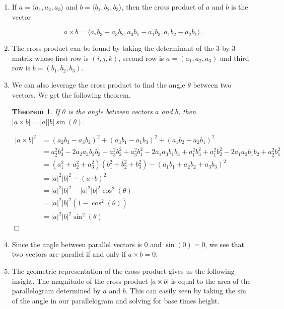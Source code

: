 \documentclass[11pt]{article}
\newtheorem{theorem}{Theorem}
\renewenvironment{proof}{{\noindent \textbf{\textit{Proof.}}}}
{\hfill $\Box$ \vspace*{0.1in}}
\begin{document}
\begin{enumerate}
    \item If $a = \langle a_1,a_2,a_3 \rangle$ and $b = \langle b_1,b_2,b_3 \rangle$, then the cross product of $a$ and $b$ is the vector 

    \begin{equation*}
        a \times b = \langle a_2b_3-a_3b_2, a_3b_1-a_1b_3, a_1b_2 - a_2b_1 \rangle.
    \end{equation*}


    \item The cross product can be found by taking the determinant of the 3 by 3 matrix whose first row is $(i,j,k)$, second row is $a = (a_1,a_2,a_3)$ and third row is $b = (b_1,b_2,b_3)$.

    \item  We can also leverage the cross product to find the angle $\theta$ between two vectors. We get the following theorem.

    \begin{theorem}
        If $\theta$ is the angle between vectors $a$ and $b$, then $|a\times b| = |a||b|\sin(\theta)$.
    \end{theorem}

    \begin{proof}
    \begin{align*}
        |a\times b|^2 &= (a_2b_3-a_3b_2)^2+(a_3b_1-a_1b_3)^2+(a_1b_2-a_2b_1)^2 \\
        &= a_2^2b_3^3-2a_2a_3b_2b_3+a_3^2b_2^2+a_3^2b_1^2-2a_1a_3b_1b_3+a_1^2b_3^2+a_1^2b_2^2 - 2a_1a_2b_1b_2 +a_2^2b_1^2 \\
        &=(a_1^2+a_2^2+a_3^2)(b_1^2+b_2^2+b_3^2)-(a_1b_1+a_2b_2+a_3b_3)^2\\
        &=|a|^2|b|^2-(a \cdot b)^2 \\
        &= |a|^2|b|^2-|a|^2|b|^2\cos^2(\theta)\\
        &=|a|^2|b|^2(1-\cos^2(\theta))\\
        &=|a|^2|b|^2\sin^2(\theta)
    \end{align*}
    \end{proof}

    \item Since the angle between parallel vectors is 0 and $\sin(0)=0$, we see that two vectors are parallel if and only if $a\times b = 0$.

    \item The geometric representation of the cross product gives us the following insight. The magnitude of the cross product $|a \times b|$ is equal to the area of the parallelogram determined by $a$ and $b$. This can easily seen by taking the sin of the angle in our parallelogram and solving for base times height.


\end{enumerate}
\end{document}
